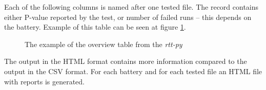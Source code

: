 \documentclass[
  digital,     %
  oneside,     %
  nosansbold,  %
  nocolorbold, %
  nolof,         %
  nolot,         %
]{fithesis4}
\begin{document}
Each of the following columns is named after one tested file. The record contains either P-value reported by the test, or number of failed runs -- this depends on the battery. Example of this table can be seen at figure \ref{fig:rtt_py_table}.
\begin{figure}
  \begin{center}
  \end{center}
  \caption{The example of the overview table from the \emph{rtt-py}}
  \label{fig:rtt_py_table}
\end{figure}


The output in the HTML format contains more information compared to the output in the CSV format. For each battery and for each tested file an HTML file with reports is generated.
\end{document}
